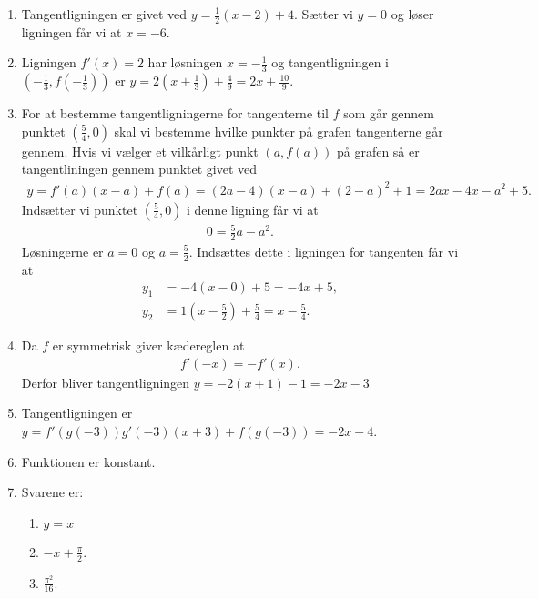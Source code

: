 \begin{enumerate}
	
	\item Tangentligningen er givet ved $y=\frac{1}{2}(x-2)+4$. Sætter vi $y=0$ og løser ligningen får vi at $x=-6$.
	
	\item Ligningen $f'(x)=2$ har løsningen $x=-\frac{1}{3}$ og tangentligningen i $ (-\frac{1}{3},f(-\frac{1}{3})) $ er $ y=2(x+\frac{1}{3}) +\frac{4}{9}=2x+\frac{10}{9}$.
	
	
	\item For at bestemme tangentligningerne for tangenterne til $f$ som går gennem punktet $(\frac{5}{4},0)$ skal vi bestemme hvilke punkter på grafen tangenterne går gennem. Hvis vi vælger et vilkårligt punkt $ (a,f(a)) $ på grafen så er tangentliningen gennem punktet givet ved
	\begin{align*}
	y=f'(a)(x-a)+f(a)=(2a-4)(x-a)+(2-a)^2+1=2ax-4x-a^2+5.
	\end{align*}
	Indsætter vi punktet $(\frac{5}{4},0)$ i denne ligning får vi at
	\begin{align*}
	0=\frac{5}{2}a-a^2.
	\end{align*}
	Løsningerne er $a=0$ og $a=\frac{5}{2}$. Indsættes dette i ligningen for tangenten får vi at
	\begin{align*}
	y_1&=-4(x-0)+5=-4x+5,\\
	y_2&=1(x-\frac{5}{2}) +\frac{5}{4}=x-\frac{5}{4}.
	\end{align*}
	
	
	\item Da $f$ er symmetrisk giver kædereglen at
	\begin{align*}
	f'(-x)=-f'(x).
	\end{align*}
	Derfor bliver tangentligningen $y= -2(x+1)-1=-2x-3$
	
	\item Tangentligningen er $y=f'(g(-3))g'(-3)(x+3)+f(g(-3))=-2x-4$.
	
	\item Funktionen er konstant.
	
	\item Svarene er:
	\begin{enumerate}
		\item $y=x$
		\item $-x+\frac{\pi}{2}$.
		\item $\frac{\pi^2}{16}$.
	\end{enumerate}


\end{enumerate}